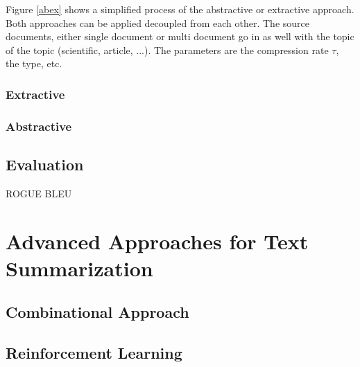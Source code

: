 Figure \ref{abex} shows a simplified process of the abstractive or extractive approach. Both approaches can be applied decoupled from each other. The source documents, either single document or multi document go in as well with the topic of the topic (scientific, article, ...). The parameters are the compression rate \(\tau\), the type, etc. 

\subsubsection{Extractive}
\subsubsection{Abstractive}

\subsection{Evaluation}
ROGUE
BLEU


\section{Advanced Approaches for Text Summarization}\label{ss:trends}

\subsection{Combinational Approach}

\subsection{Reinforcement Learning}
